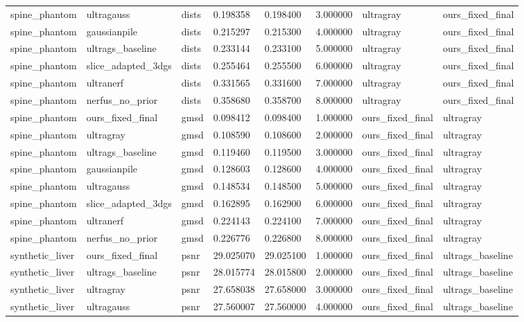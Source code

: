 \begin{tabular}{llllllll}
spine\_phantom & ultragauss & dists & 0.198358 & 0.198400 & 3.000000 & ultragray & ours\_fixed\_final \\
spine\_phantom & gaussianpile & dists & 0.215297 & 0.215300 & 4.000000 & ultragray & ours\_fixed\_final \\
spine\_phantom & ultrags\_baseline & dists & 0.233144 & 0.233100 & 5.000000 & ultragray & ours\_fixed\_final \\
spine\_phantom & slice\_adapted\_3dgs & dists & 0.255464 & 0.255500 & 6.000000 & ultragray & ours\_fixed\_final \\
spine\_phantom & ultranerf & dists & 0.331565 & 0.331600 & 7.000000 & ultragray & ours\_fixed\_final \\
spine\_phantom & nerfus\_no\_prior & dists & 0.358680 & 0.358700 & 8.000000 & ultragray & ours\_fixed\_final \\
spine\_phantom & ours\_fixed\_final & gmsd & 0.098412 & 0.098400 & 1.000000 & ours\_fixed\_final & ultragray \\
spine\_phantom & ultragray & gmsd & 0.108590 & 0.108600 & 2.000000 & ours\_fixed\_final & ultragray \\
spine\_phantom & ultrags\_baseline & gmsd & 0.119460 & 0.119500 & 3.000000 & ours\_fixed\_final & ultragray \\
spine\_phantom & gaussianpile & gmsd & 0.128603 & 0.128600 & 4.000000 & ours\_fixed\_final & ultragray \\
spine\_phantom & ultragauss & gmsd & 0.148534 & 0.148500 & 5.000000 & ours\_fixed\_final & ultragray \\
spine\_phantom & slice\_adapted\_3dgs & gmsd & 0.162895 & 0.162900 & 6.000000 & ours\_fixed\_final & ultragray \\
spine\_phantom & ultranerf & gmsd & 0.224143 & 0.224100 & 7.000000 & ours\_fixed\_final & ultragray \\
spine\_phantom & nerfus\_no\_prior & gmsd & 0.226776 & 0.226800 & 8.000000 & ours\_fixed\_final & ultragray \\
synthetic\_liver & ours\_fixed\_final & psnr & 29.025070 & 29.025100 & 1.000000 & ours\_fixed\_final & ultrags\_baseline \\
synthetic\_liver & ultrags\_baseline & psnr & 28.015774 & 28.015800 & 2.000000 & ours\_fixed\_final & ultrags\_baseline \\
synthetic\_liver & ultragray & psnr & 27.658038 & 27.658000 & 3.000000 & ours\_fixed\_final & ultrags\_baseline \\
synthetic\_liver & ultragauss & psnr & 27.560007 & 27.560000 & 4.000000 & ours\_fixed\_final & ultrags\_baseline \\

\end{tabular}
